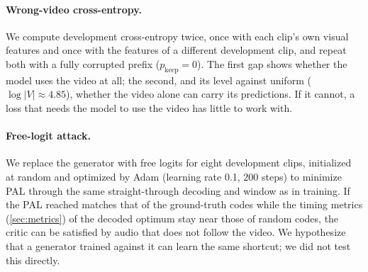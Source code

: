 \paragraph{Wrong-video cross-entropy.}
We compute development cross-entropy twice, once with each clip's own visual features and once with the features of a different development clip, and repeat both with a fully corrupted prefix ($p_{\mathrm{keep}} = 0$). The first gap shows whether the model uses the video at all; the second, and its level against uniform ($\log |V| \approx 4.85$), whether the video alone can carry its predictions. If it cannot, a loss that needs the model to use the video has little to work with.

\paragraph{Free-logit attack.}
We replace the generator with free logits for eight development clips, initialized at random and optimized by Adam (learning rate 0.1, 200 steps) to minimize PAL through the same straight-through decoding and window as in training. If the PAL reached matches that of the ground-truth codes while the timing metrics (\cref{sec:metrics}) of the decoded optimum stay near those of random codes, the critic can be satisfied by audio that does not follow the video. We hypothesize that a generator trained against it can learn the same shortcut; we did not test this directly.
